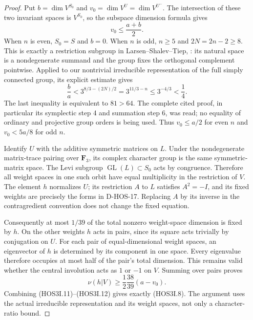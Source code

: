 \begin{proof}
Put $b=\dim V^{S_0}$ and $v_0=\dim V^U=\dim V^{U^-}$.
The intersection of these two invariant spaces is $V^{S_0}$,
so the subspace dimension formula gives
\[
                         v_0\le\frac{a+b}{2}.                \tag{HOS3I.11}
\]
When $n$ is even, $S_0=S$ and $b=0$. When $n$ is odd, $n\ge5$
and $2N=2n-2\ge8$. This is exactly a restriction subgroup in
Larsen--Shalev--Tiep, \cite[Proposition~4.2.3, pp.~1909--1912]{HOS:LST2011}:
its natural space is a nondegenerate summand and the group fixes
the orthogonal complement pointwise. Applied to our nontrivial
irreducible representation of the full simply connected group, its
explicit estimate gives
\[
 \frac ba<3^{8/3-(2N)/2}=3^{11/3-n}
             \le3^{-4/3}<\frac14.                            \tag{HOS3I.12}
\]
The last inequality is equivalent to $81>64$. The complete cited
proof, in particular its symplectic step 4 and summation step 6,
was read; no equality of ordinary and projective group orders is
being used. Thus $v_0\le a/2$ for even $n$ and $v_0<5a/8$ for
odd $n$.

Identify $U$ with the additive symmetric matrices on $L$. Under
the nondegenerate matrix-trace pairing over $\mathbf F_3$, its
complex character group is the same symmetric-matrix space.
The Levi subgroup $\operatorname{GL}(L)\subset S_0$ acts by
congruence. Therefore all weight spaces in one such orbit have
equal multiplicity in the restriction of $V$. The element $h$
normalizes $U$; its restriction $A$ to $L$ satisfies $A^2=-I$,
and its fixed weights are precisely the forms in D-HOS-17.
Replacing $A$ by its inverse in the contragredient convention
does not change the fixed equation.

Consequently at most $1/39$ of the total nonzero weight-space
dimension is fixed by $h$. On the other weights $h$ acts in pairs,
since its square acts trivially by conjugation on $U$. For each
pair of equal-dimensional weight spaces, an eigenvector of $h$
is determined by its component in one space. Every eigenvalue
therefore occupies at most half of the pair's total dimension.
This remains valid whether the central involution acts as $1$
or $-1$ on $V$. Summing over pairs proves
\[
 \nu(h|V)\ge\frac12\frac{38}{39}(a-v_0).                    \tag{HOS3I.13}
\]
Combining (HOS3I.11)--(HOS3I.12) gives exactly (HOS3I.8).
The argument uses the actual irreducible representation and its
weight spaces, not only a character-ratio bound.
\end{proof}

